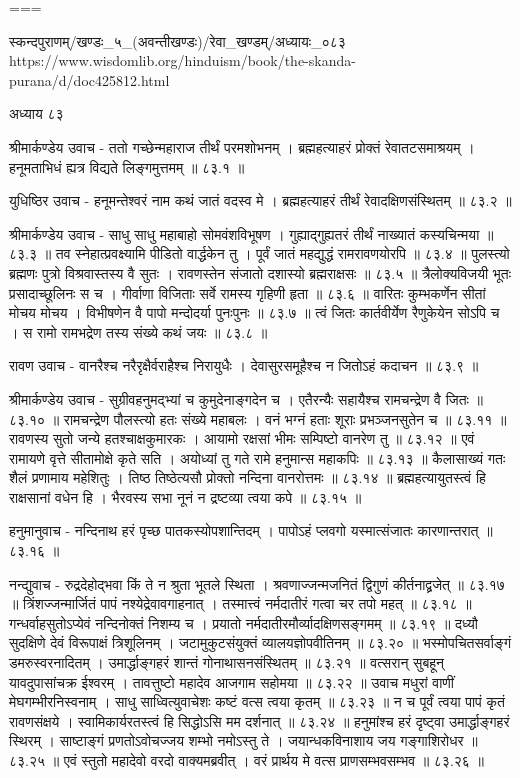 ===

स्कन्दपुराणम्/खण्डः_५_(अवन्तीखण्डः)/रेवा_खण्डम्/अध्यायः_०८३
https://www.wisdomlib.org/hinduism/book/the-skanda-purana/d/doc425812.html

अध्याय ८३

श्रीमार्कण्डेय उवाच -
ततो गच्छेन्महाराज तीर्थं परमशोभनम् ।
ब्रह्महत्याहरं प्रोक्तं रेवातटसमाश्रयम् ।
हनूमताभिधं ह्यत्र विद्यते लिङ्गमुत्तमम् ॥ ८३.१ ॥

युधिष्ठिर उवाच -
हनूमन्तेश्वरं नाम कथं जातं वदस्व मे ।
ब्रह्महत्याहरं तीर्थं रेवादक्षिणसंस्थितम् ॥ ८३.२ ॥

श्रीमार्कण्डेय उवाच -
साधु साधु महाबाहो सोमवंशविभूषण ।
गुह्याद्गुह्यतरं तीर्थं नाख्यातं कस्यचिन्मया ॥ ८३.३ ॥
तव स्नेहात्प्रवक्ष्यामि पीडितो वार्द्धकेन तु ।
पूर्वं जातं महद्युद्धं रामरावणयोरपि ॥ ८३.४ ॥
पुलस्त्यो ब्रह्मणः पुत्रो विश्रवास्तस्य वै सुतः ।
रावणस्तेन संजातो दशास्यो ब्रह्मराक्षसः ॥ ८३.५ ॥
त्रैलोक्यविजयी भूतः प्रसादाच्छूलिनः स च ।
गीर्वाणा विजिताः सर्वे रामस्य गृहिणी हृता ॥ ८३.६ ॥
वारितः कुम्भकर्णेन सीतां मोचय मोचय ।
विभीषणेन वै पापो मन्दोदर्या पुनःपुनः ॥ ८३.७ ॥
त्वं जितः कार्तवीर्येण रैणुकेयेन सोऽपि च ।
स रामो रामभद्रेण तस्य संख्ये कथं जयः ॥ ८३.८ ॥

रावण उवाच -
वानरैश्च नरैरृक्षैर्वराहैश्च निरायुधैः ।
देवासुरसमूहैश्च न जितोऽहं कदाचन ॥ ८३.९ ॥

श्रीमार्कण्डेय उवाच -
सुग्रीवहनुमद्भ्यां च कुमुदेनाङ्गदेन च ।
एतैरन्यैः सहायैश्च रामचन्द्रेण वै जितः ॥ ८३.१० ॥
रामचन्द्रेण पौलस्त्यो हतः संख्ये महाबलः ।
वनं भग्नं हताः शूराः प्रभञ्जनसुतेन च ॥ ८३.११ ॥
रावणस्य सुतो जन्ये हतश्चाक्षकुमारकः ।
आयामो रक्षसां भीमः सम्पिष्टो वानरेण तु ॥ ८३.१२ ॥
एवं रामायणे वृत्ते सीतामोक्षे कृते सति ।
अयोध्यां तु गते रामे हनुमान्स महाकपिः ॥ ८३.१३ ॥
कैलासाख्यं गतः शैलं प्रणामाय महेशितुः ।
तिष्ठ तिष्ठेत्यसौ प्रोक्तो नन्दिना वानरोत्तमः ॥ ८३.१४ ॥
ब्रह्महत्यायुतस्त्वं हि राक्षसानां वधेन हि ।
भैरवस्य सभा नूनं न द्रष्टव्या त्वया कपे ॥ ८३.१५ ॥

हनुमानुवाच -
नन्दिनाथ हरं पृच्छ पातकस्योपशान्तिदम् ।
पापोऽहं प्लवगो यस्मात्संजातः कारणान्तरात् ॥ ८३.१६ ॥

नन्द्युवाच -
रुद्रदेहोद्भवा किं ते न श्रुता भूतले स्थिता ।
श्रवणाज्जन्मजनितं द्विगुणं कीर्तनाद्व्रजेत् ॥ ८३.१७ ॥
त्रिंशज्जन्मार्जितं पापं नश्येद्रेवावगाहनात् ।
तस्मात्त्वं नर्मदातीरं गत्वा चर तपो महत् ॥ ८३.१८ ॥
गन्धर्वाहसुतोऽप्येवं नन्दिनोक्तं निशम्य च ।
प्रयातो नर्मदातीरमौर्व्यादक्षिणसङ्गमम् ॥ ८३.१९ ॥
दध्यौ सुदक्षिणे देवं विरूपाक्षं त्रिशूलिनम् ।
जटामुकुटसंयुक्तं व्यालयज्ञोपवीतिनम् ॥ ८३.२० ॥
भस्मोपचितसर्वाङ्गं डमरुस्वरनादितम् ।
उमार्द्धाङ्गहरं शान्तं गोनाथासनसंस्थितम् ॥ ८३.२१ ॥
वत्सरान् सुबहून् यावदुपासांचक्र ईश्वरम् ।
तावत्तुष्टो महादेव आजगाम सहोमया ॥ ८३.२२ ॥
उवाच मधुरां वाणीं मेघगम्भीरनिस्वनाम् ।
साधु साध्वित्युवाचेशः कष्टं वत्स त्वया कृतम् ॥ ८३.२३ ॥
न च पूर्वं त्वया पापं कृतं रावणसंक्षये ।
स्वामिकार्यरतस्त्वं हि सिद्धोऽसि मम दर्शनात् ॥ ८३.२४ ॥
हनुमांश्च हरं दृष्ट्वा उमार्द्धाङ्गहरं स्थिरम् ।
साष्टाङ्गं प्रणतोऽवोचज्जय शम्भो नमोऽस्तु ते ।
जयान्धकविनाशाय जय गङ्गाशिरोधर ॥ ८३.२५ ॥
एवं स्तुतो महादेवो वरदो वाक्यमब्रवीत् ।
वरं प्रार्थय मे वत्स प्राणसम्भवसम्भव ॥ ८३.२६ ॥

